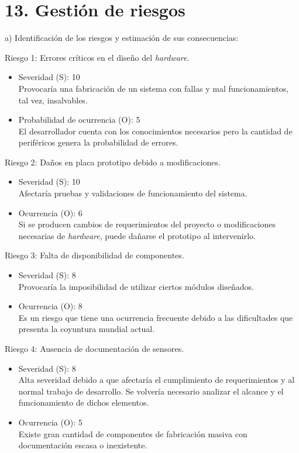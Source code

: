 \documentclass[
11pt, %
]{charter}
\begin{document}
\section{13. Gestión de riesgos}
\label{sec:riesgos}

a) Identificación de los riesgos y estimación de sus consecuencias:
 
Riesgo 1: Errores críticos en el diseño del \textit{hardware}.
\begin{itemize}
	\item Severidad (S): 10\\
	Provocaría una fabricación de un sistema con fallas y mal funcionamientos, tal vez, insalvables. 
	\item Probabilidad de ocurrencia (O): 5\\
	El desarrollador cuenta con los conocimientos necesarios pero la cantidad de periféricos genera la probabilidad de errores.
\end{itemize}   

Riesgo 2: Daños en placa prototipo debido a modificaciones.
\begin{itemize}
	\item Severidad (S): 10\\
	Afectaría pruebas y validaciones de funcionamiento del sistema.
	\item Ocurrencia (O): 6\\
	Si se producen cambios de requerimientos del proyecto o modificaciones necesarias de \textit{hardware}, puede dañarse el prototipo al intervenirlo.
\end{itemize}

Riesgo 3: Falta de disponibilidad de componentes.
\begin{itemize}
	\item Severidad (S): 8\\
	Provocaría la imposibilidad de utilizar ciertos módulos diseñados.
	\item Ocurrencia (O): 8\\
	Es un riesgo que tiene una ocurrencia frecuente debido a las dificultades que presenta la coyuntura mundial actual.
\end{itemize}

Riesgo 4: Ausencia de documentación de sensores.
\begin{itemize}
	\item Severidad (S): 8\\
	Alta severidad debido a que afectaría el cumplimiento de requerimientos y al normal trabajo de desarrollo. Se volvería necesario analizar el alcance y el funcionamiento de dichos elementos.
	\item Ocurrencia (O): 5\\
	Existe gran cantidad de componentes de fabricación masiva con documentación escasa o inexistente.
\end{itemize}
\end{document}
